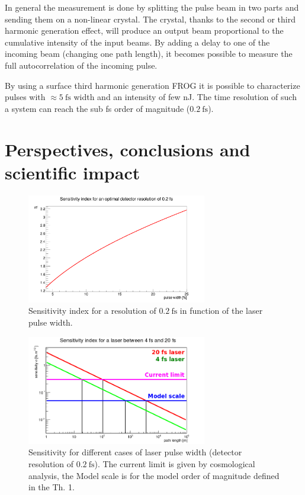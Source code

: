 \documentclass[9pt, a4, twoside]{article}
\begin{document}
In general the measurement is done by splitting the pulse beam in two parts and sending them on a non-linear crystal. The crystal, thanks to the second or third harmonic generation effect, will produce an output beam proportional to the cumulative intensity of the input beams. By adding a delay to one of the incoming beam (changing one path length), it becomes possible to measure the full autocorrelation of the incoming pulse.

By using a surface third harmonic generation FROG it is possible to characterize pulses with $\approx5~\mathrm{fs}$ width and an intensity of few nJ. The time resolution of such a system can reach the sub fs order of magnitude ($0.2~\mathrm{fs}$).

\section{Perspectives, conclusions and scientific impact}

\begin{figure}[!]
\centering
\includegraphics[width=0.70\textwidth]{./img/Pwdependency.png}
\caption{Sensitivity index for a resolution of $0.2~\mathrm{fs}$ in function of the laser pulse width.}
\label{fig:sensivindex}
\end{figure}

\begin{figure}[!]
\centering
\includegraphics[width=0.7\textwidth]{./img/total_sensitivity.png}
\caption{Sensitivity for different cases of laser pulse width (detector resolution of $0.2~\mathrm{fs}$). The current limit is given by cosmological analysis, the Model scale is for the model order of magnitude defined in the Th. 1.}
\label{fig:sensiv}
\end{figure}
\end{document}

